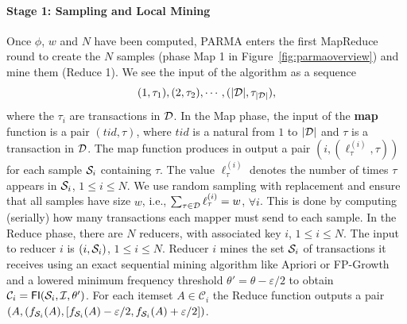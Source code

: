 \paragraph*{Stage 1: Sampling and Local Mining} Once $\phi$, $w$
and $N$ have been computed, PARMA enters the first MapReduce round to create
the $N$ samples (phase Map 1 in Figure~\ref{fig:parmaoverview}) and mine them (Reduce 1).
We see the input of the algorithm as a sequence
\[
(1,\tau_1),(2,\tau_2),\cdots,(|{\cal D}|,\tau_{|{\cal D}|}),\]
where the $\tau_i$ are transactions in ${\cal D}$.
In the Map phase, the input of the {\bf map} function is a pair $(tid, \tau)$, where
$tid$ is a natural from $1$ to $|{\cal D}|$ and $\tau$ is a transaction in ${\cal D}$. The
map function produces in output a pair $(i,(\ell^{(i)}_\tau,\tau))$ for each
sample ${\cal S}_i$ containing $\tau$. The value $\ell^{(i)}_\tau$ denotes the
number of times $\tau$ appears in ${\cal S}_i$, $1\le i \le N$. We use random sampling
with replacement and ensure that all samples have size $w$, i.e.,
$\sum_{\tau\in{\cal D}}\ell^{(i)}_\tau=w$, $\forall i$. This is done by computing
(serially) how many transactions each mapper must send to each sample. In the
Reduce phase, there are $N$ reducers, with associated key $i$, $1\le i \le N$.
The input to reducer $i$ is $(i,{\cal S}_i)$, $1\le i\le N$. Reducer $i$ mines the
set ${\cal S}_i$ of transactions it receives using an exact sequential mining
algorithm like Apriori or FP-Growth and a lowered minimum frequency threshold
$\theta'=\theta-\varepsilon/2$ to obtain
$\mathcal{C}_i=\mathsf{FI}({\cal S}_i,{\cal I},\theta')$. For each itemset $A\in\mathcal{C}_i$
the Reduce function outputs a pair $(A,
(f_{{\cal S}_i}(A),[f_{{\cal S}_i}(A)-\varepsilon/2,f_{{\cal S}_i}(A)+\varepsilon/2])$.

